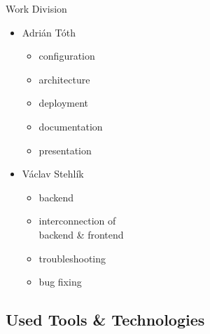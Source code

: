 \documentclass[]{beamer}
\begin{document}
    \begin{frame}{Work Division}
      \setlength{\columnsep}{-20mm}
      \begin{adjustwidth}{10mm}{-10mm}
        \begin{multicols}{2}
          \begin{itemize}
            \item Adrián Tóth
            \begin{itemize}
              \item configuration
              \item architecture
              \item deployment
              \item documentation
              \item presentation
            \end{itemize}

            \columnbreak

            \item Václav Stehlík
            \begin{itemize}
              \item backend
              \item interconnection of\\backend \& frontend
              \item troubleshooting
              \item bug fixing
            \end{itemize}
          \end{itemize}
        \end{multicols}
      \end{adjustwidth}
    \end{frame}

  \subsection{Used Tools \& Technologies}
\end{document}
